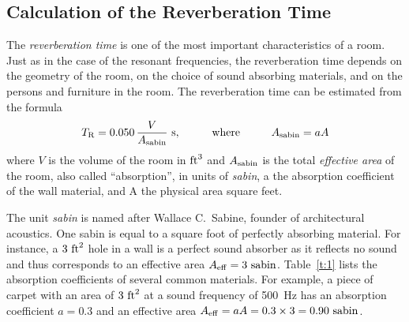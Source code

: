 \documentclass[11pt]{NSF}
\def\be{\begin{equation}}
\def\ee{\end{equation}}
\begin{document}
\subsection{Calculation of the Reverberation Time}

The {\em reverberation time} is one of the most important characteristics of
a room. Just as in the case of the resonant frequencies, the
reverberation time depends on the geometry of the room, on the choice of
sound absorbing materials, and on the persons and furniture in the room.
The reverberation time can be estimated from the formula 
%
\be
T_{\rm R} = 0.050\,\frac{V}{A_{\rm sabin}}~{\rm s}, \rule{1cm}{0.0mm} {\rm where} \rule{1cm}{0.0mm} A_{\rm sabin} = aA
\label{e:TR}
\ee
%
where $V$ is the volume of the room in ${\rm ft}^3$ and $A_{\rm
sabin}$ is the total {\em effective area} of the room, also called
``absorption”, in units of {\em sabin},  a the absorption coefficient of the wall material, and A the physical area square feet. 

The unit {\em sabin} is named after Wallace C.~Sabine, founder of
architectural acoustics. One sabin is equal to a square foot of
perfectly absorbing material. For instance, a $3~{\rm ft}^2$ 
hole in a wall is a perfect sound absorber as it reflects no sound 
and thus corresponds to an effective area 
$A_{\rm eff} = 3~{\rm sabin}$. 
Table~\ref{t:1} lists the absorption
coefficients of several common materials. For example, a piece of
carpet with an area of $3~{\rm ft}^2$ at a sound frequency of 
500~Hz has an absorption coefficient $a = 0.3$ and an effective 
area $A_{\rm eff} = a A = 0.3\times 3= 0.90~{\rm sabin}$.
\end{document}
